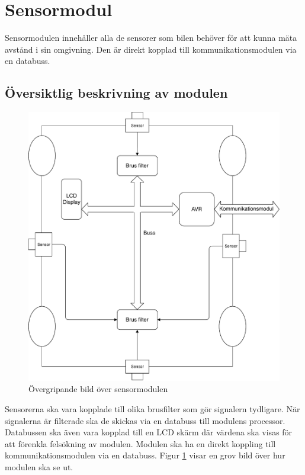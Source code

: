 \documentclass[systemskiss/skiss.tex]{subfiles}
\begin{document}
\section{Sensormodul}
Sensormodulen innehåller alla de sensorer som bilen behöver för att kunna mäta avstånd i sin omgivning. Den är direkt kopplad till kommunikationsmodulen via en databuss.
\subsection{Översiktlig beskrivning av modulen}
\begin{figure}[h]
    \centering
    \includegraphics[width=0.6\linewidth]{systemskiss/figures/sensormodul.pdf}
    \caption{Övergripande bild över sensormodulen}
    \label{fig:sensorskiss}
\end{figure}

Sensorerna ska vara kopplade till olika brusfilter som gör signalern tydligare. När signalerna är filterade ska de skickas via en databuss till modulens processor. Databussen ska även vara kopplad till en LCD skärm där värdena ska visas för att förenkla felsökning av modulen. Modulen ska ha en direkt koppling till kommunikationsmodulen via en databuss. Figur \ref{fig:sensorskiss} visar en grov bild över hur modulen ska se ut.
\end{document}
